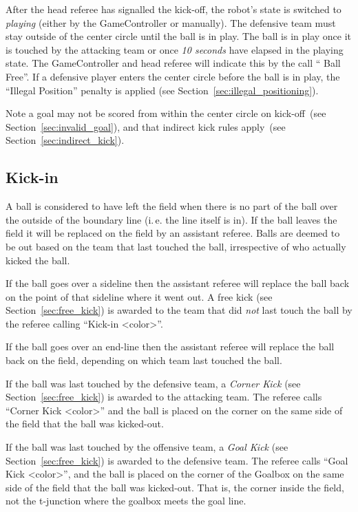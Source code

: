 \documentclass[12pt]{article}
\newcommand{\ie}{\mbox{i.\,e.}\xspace}
\newcommand{\cf}{see\xspace}
\newcommand{\KickOffBallFreeTime}{10 seconds\xspace}
\begin{document}
After the head referee has signalled the kick-off, the robot's state is switched to \emph{playing} (either by the GameController or manually).
The defensive team must stay outside of the center circle until the ball is in play.  The ball is in play once it is touched by the attacking team or once \emph{\KickOffBallFreeTime} have elapsed in the playing state.
The GameController and head referee will indicate this by the call `` Ball Free''.
If a defensive player enters the center circle before the ball is in play, the ``Illegal Position'' penalty is applied (\cf Section~\ref{sec:illegal_positioning}).

Note a goal may not be scored from within the center circle on kick-off~(\cf Section~\ref{sec:invalid_goal}), and that indirect kick rules apply~(\cf Section~\ref{sec:indirect_kick}).

\subsection{Kick-in}
\label{sec:kick_in}

A ball is considered to have left the field when there is no part of the ball over the outside of the boundary line (\ie the line itself is in). If the ball leaves the field it will be replaced on the field by an assistant referee. Balls are deemed to be out based on the team that last touched the ball, irrespective of who actually kicked the ball.

If the ball goes over a sideline then the assistant referee will replace the ball back on the point of that sideline where it went out. A free kick (\cf Section~\ref{sec:free_kick}) is awarded to the team that did \emph{not} last touch the ball by the referee calling ``Kick-in \textless color\textgreater''.

If the ball goes over an end-line then the assistant referee will replace the ball back on the field, depending on which team last touched the ball.

If the ball was last touched by the defensive team, a \emph{Corner Kick} (\cf Section~\ref{sec:free_kick}) is awarded to the attacking team. The referee calls ``Corner Kick \textless color\textgreater'' and the ball is placed on the corner on the same side of the field that the ball was kicked-out.

If the ball was last touched by the offensive team, a \emph{Goal Kick} (\cf Section~\ref{sec:free_kick}) is awarded to the defensive team. The referee calls ``Goal Kick \textless color\textgreater'', and the ball is placed on the corner of the Goalbox on the same side of the field that the ball was kicked-out. That is, the corner inside the field, not the t-junction where the goalbox meets the goal line.
\end{document}
